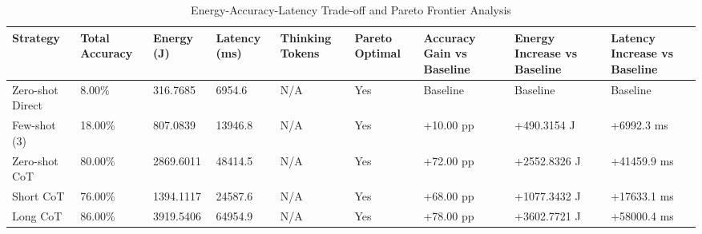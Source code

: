 \begin{table}
\caption{Energy-Accuracy-Latency Trade-off and Pareto Frontier Analysis}
\label{tab:tradeoff_comparison}
\begin{tabular}{lllllllll}
\toprule
Strategy & Total Accuracy & Energy (J) & Latency (ms) & Thinking Tokens & Pareto Optimal & Accuracy Gain vs Baseline & Energy Increase vs Baseline & Latency Increase vs Baseline \\
\midrule
Zero-shot Direct & 8.00\% & 316.7685 & 6954.6 & N/A & Yes & Baseline & Baseline & Baseline \\
Few-shot (3) & 18.00\% & 807.0839 & 13946.8 & N/A & Yes & +10.00 pp & +490.3154 J & +6992.3 ms \\
Zero-shot CoT & 80.00\% & 2869.6011 & 48414.5 & N/A & Yes & +72.00 pp & +2552.8326 J & +41459.9 ms \\
Short CoT & 76.00\% & 1394.1117 & 24587.6 & N/A & Yes & +68.00 pp & +1077.3432 J & +17633.1 ms \\
Long CoT & 86.00\% & 3919.5406 & 64954.9 & N/A & Yes & +78.00 pp & +3602.7721 J & +58000.4 ms \\
\bottomrule
\end{tabular}
\end{table}
